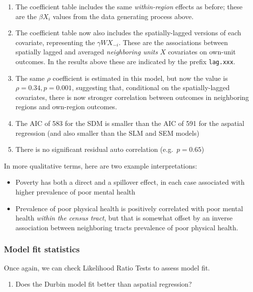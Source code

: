 \documentclass[
]{book}
\newcommand{\passthrough}[1]{#1}
\providecommand{\tightlist}{%
  \setlength{\itemsep}{0pt}\setlength{\parskip}{0pt}}
\begin{document}
\begin{enumerate}
\def\labelenumi{\arabic{enumi}.}
\tightlist
\item
  The coefficient table includes the same \emph{within-region} effects as before; these are the \(\beta X_i\) values from the data generating process above.
\item
  The coefficient table now also includes the spatially-lagged versions of each covariate, representing the \(\gamma WX_{-i}\). These are the associations between spatially lagged and averaged \emph{neighboring units} \(X\) covariates on own-unit outcomes. In the results above these are indicated by the prefix \passthrough{\lstinline!lag.xxx!}.
\item
  The same \(\rho\) coefficient is estimated in this model, but now the value is \(\rho = 0.34, p=0.001\), suggesting that, conditional on the spatially-lagged covariates, there is now stronger correlation between outcomes in neighboring regions and own-region outcomes.
\item
  The AIC of 583 for the SDM is smaller than the AIC of 591 for the aspatial regression (and also smaller than the SLM and SEM models)
\item
  There is no significant residual auto correlation (e.g.~\(p=0.65\))
\end{enumerate}

In more qualitative terms, here are two example interpretations:

\begin{itemize}
\tightlist
\item
  Poverty has both a direct and a spillover effect, in each case associated with higher prevalence of poor mental health
\item
  Prevalence of poor physical health is positively correlated with poor mental health \emph{within the census tract}, but that is somewhat offset by an inverse association between neighboring tracts prevalence of poor physical health.
\end{itemize}

\hypertarget{model-fit-statistics-1}{%
\subsubsection{Model fit statistics}\label{model-fit-statistics-1}}

Once again, we can check Likelihood Ratio Tests to assess model fit.

\begin{enumerate}
\def\labelenumi{\arabic{enumi}.}
\tightlist
\item
  Does the Durbin model fit better than aspatial regression?
\end{enumerate}
\end{document}
